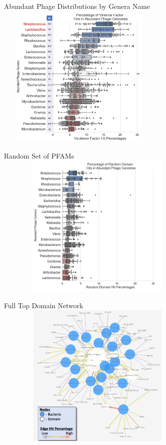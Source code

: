 \documentclass[11pt, xcolor=table]{beamer}
\begin{document}
	\begin{frame}{Abundant Phage Distributions by Genera Name}
	\centering
	\includegraphics[height=7cm, width=8cm]{CPBS_11_18/Abundances.jpg}
	
	\end{frame}
	\begin{frame}{Random Set of PFAMs}
	\center
	\includegraphics[height=7cm, width=10cm]{CPBS_11_18/Random.jpg}
	\end{frame}
	\begin{frame}{Full Top Domain Network}
	\center
	\includegraphics[height=7cm, width=10cm]{CPBS_11_18/Network.jpg}
	\end{frame}
	
\end{document}
